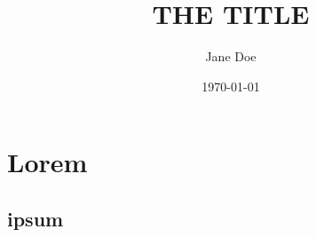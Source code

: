 \documentclass[11pt, oneside]{article}
\title{THE TITLE}
\author{Jane Doe}
\date{\today}
\begin{document}
\maketitle
\tableofcontents

\section{Lorem}
\lipsum[1]
\subsection{ipsum}
\lipsum[2-4]                  %
\end{document}
